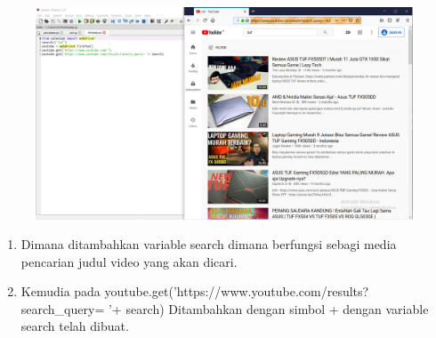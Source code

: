 \begin{figure}[!htbp]
    \centering
    \includegraphics[scale=0.3]{figure/akhirnya.png}
    \label{gambar 1}
\end{figure}

\begin{enumerate}
    \item Dimana ditambahkan variable search dimana berfungsi sebagi media pencarian judul video yang akan dicari.
    \item Kemudia pada youtube.get('https://www.youtube.com/results?search\_query= '+ search)
    Ditambahkan dengan simbol + dengan variable search telah dibuat.
\end{enumerate}
